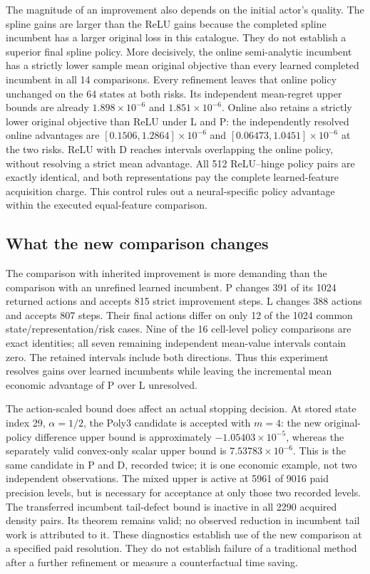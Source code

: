 The magnitude of an improvement also depends on the initial actor's quality.
The spline gains are larger than the ReLU gains because the completed spline
incumbent has a larger original loss in this catalogue. They do not establish
a superior final spline policy. More decisively, the online semi-analytic
incumbent has a strictly lower sample mean original objective than every
learned completed incumbent in all 14 comparisons. Every refinement leaves
that online policy unchanged on the 64 states at both risks. Its independent
mean-regret upper bounds are already $1.898\times10^{-6}$ and
$1.851\times10^{-6}$. Online also retains a strictly lower original objective
than ReLU under L and P: the independently resolved online advantages are
$[0.1506,1.2864]\times10^{-6}$ and
$[0.06473,1.0451]\times10^{-6}$ at the two risks. ReLU with D reaches
intervals overlapping the online policy, without resolving a strict mean
advantage. All 512 ReLU--hinge policy pairs are exactly identical, and both
representations pay the complete learned-feature acquisition charge. This
control rules out a neural-specific policy advantage within the executed
equal-feature comparison.

\subsection{What the new comparison changes}
\label{sec:incrementalevidence120}

The comparison with inherited improvement is more demanding than the
comparison with an unrefined learned incumbent. P changes 391 of its 1024
returned actions and accepts 815 strict improvement steps. L changes 388
actions and accepts 807 steps. Their final actions differ on only 12 of the
1024 common state/representation/risk cases. Nine of the 16 cell-level
policy comparisons are exact identities; all seven remaining independent
mean-value intervals contain zero. The retained intervals include both
directions. Thus this experiment resolves gains over learned incumbents
while leaving the incremental mean economic advantage of P over L
unresolved.

The action-scaled bound does affect an actual stopping decision. At stored
state index 29, $\alpha=1/2$, the Poly3 candidate is accepted with $m=4$:
the new original-policy difference upper bound is approximately
$-1.05403\times10^{-5}$, whereas the separately valid convex-only scalar
upper bound is $7.53783\times10^{-6}$. This is the same candidate in P and
D, recorded twice; it is one economic example, not two independent
observations. The mixed upper is active at 5961 of 9016 paid precision
levels, but is necessary for acceptance at only those two recorded levels.
The transferred incumbent tail-defect bound is inactive in all 2290 acquired
density pairs. Its theorem remains valid; no observed reduction in incumbent
tail work is attributed to it. These diagnostics establish use of the new
comparison at a specified paid resolution. They do not establish failure of
a traditional method after a further refinement or measure a counterfactual
time saving.

